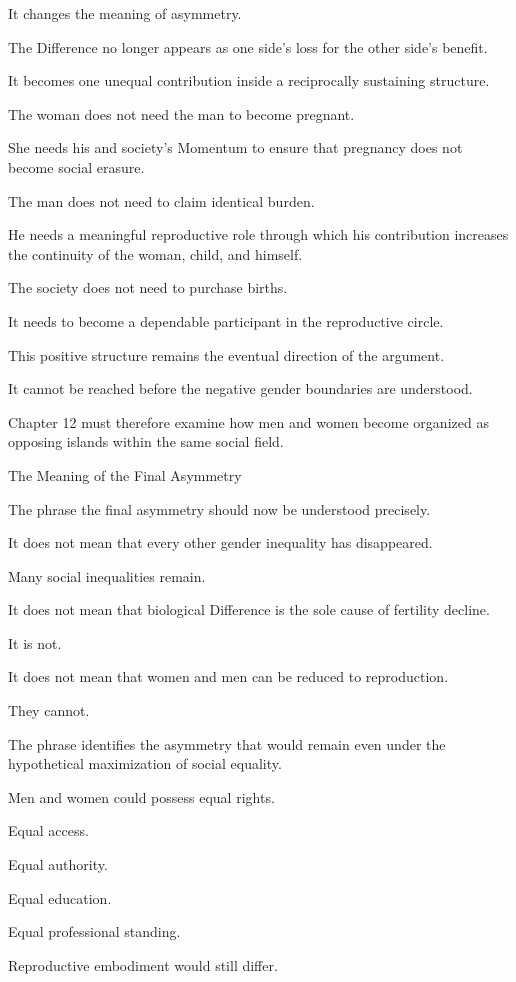 It changes the meaning of asymmetry.

The Difference no longer appears as one side’s loss for the other side’s benefit.

It becomes one unequal contribution inside a reciprocally sustaining structure.

The woman does not need the man to become pregnant.

She needs his and society’s Momentum to ensure that pregnancy does not become social erasure.

The man does not need to claim identical burden.

He needs a meaningful reproductive role through which his contribution increases the continuity of the woman, child, and himself.

The society does not need to purchase births.

It needs to become a dependable participant in the reproductive circle.

This positive structure remains the eventual direction of the argument.

It cannot be reached before the negative gender boundaries are understood.

Chapter 12 must therefore examine how men and women become organized as opposing islands within the same social field.

The Meaning of the Final Asymmetry

The phrase the final asymmetry should now be understood precisely.

It does not mean that every other gender inequality has disappeared.

Many social inequalities remain.

It does not mean that biological Difference is the sole cause of fertility decline.

It is not.

It does not mean that women and men can be reduced to reproduction.

They cannot.

The phrase identifies the asymmetry that would remain even under the hypothetical maximization of social equality.

Men and women could possess equal rights.

Equal access.

Equal authority.

Equal education.

Equal professional standing.

Reproductive embodiment would still differ.

